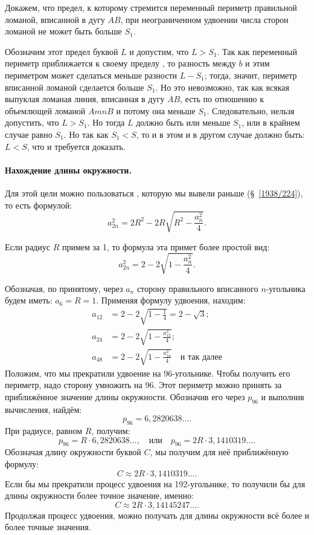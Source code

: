 \documentclass[oneside]{book}
\begin{document}
Докажем, что предел, к которому стремится переменный периметр правильной ломаной, вписанной в дугу $AB$, при неограниченном удвоении числа сторон ломаной не может быть больше $S_1$.

Обозначим этот предел буквой $L$ и допустим, что $L>S_1$.
Так как переменный периметр приближается к своему пределу , то разность между $b$ и этим периметром может сделаться меньше разности $L-S_1$; тогда, значит, периметр вписанной ломаной сделается больше $S_1$.
Но это невозможно, так как всякая выпуклая ломаная линия, вписанная в дугу $AB$, есть  по отношению к объемлющей ломаной $AmnB$ и потому она меньше $S_1$.
Следовательно, нельзя допустить, что $L>S_1$.
Но тогда $L$ должно быть или меньше $S_1$, или в крайнем случае равно $S_1$.
Но так как $S_1<S$, то и в этом и в другом случае должно быть:
$L<S$, что и требуется доказать.

\paragraph{Нахождение длины окружности.}\label{1938/237}
Для этой цели можно пользоваться , которую мы вывели раньше (§~\ref{1938/224}), то есть формулой:
\[a_{2n}^2=2R^2-2R\sqrt{R^2-\frac{a_n^2}4}.\]

Если радиус $R$ примем за 1, то формула эта примет более простой вид:
\[a_{2n}^2=2-2\sqrt{1-\frac{a_n^2}4}.\]


Обозначая, по принятому, через $a_n$ сторону правильного вписанного $n$-угольника будем иметь:
$a_6=R=1$.
Применяя формулу удвоения, находим:
\begin{align*}
a_{12}&=2-2\sqrt{1-\tfrac14}=2-\sqrt3;
\\
a_{24}&=2-2\sqrt{1-\tfrac{a_{12}^2}{4}};
\\
a_{48}&=2-2\sqrt{1-\tfrac{a_{24}^2}{4}}\quad\text{и так далее}
\end{align*}
Положим, что мы прекратили удвоение на 96-угольнике.
Чтобы получить его периметр, надо сторону умножить на 96.
Этот периметр можно принять за приближённое значение длины окружности.
Обозначив его через $p_{96}$ и выполнив вычисления, найдём:
\[p_{96} = 6{,}2820638\dots.\]
При радиусе, равном $R$, получим:
\[p_{96}=R\cdot6{,}2820638\dots,
\quad\text{или}\quad
p_{96}=2R\cdot3{,}1410319\dots.\]
Обозначая длину окружности буквой $C$, мы получим для неё приближённую формулу:
\[C\approx 2R\cdot3{,}1410319\dots.\]
Если бы мы прекратили процесс удвоения на 192-угольнике, то получили бы для длины окружности более точное значение, именно:
\[C\approx2R\cdot3{,}14145247\dots.\]
Продолжая процесс удвоения, можно получать для длины окружности всё более и более точные значения.
\end{document}
